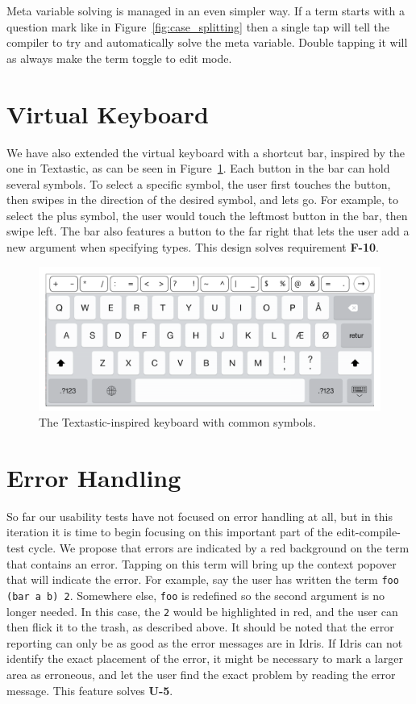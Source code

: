 Meta variable solving is managed in an even simpler way. If a term starts with
a question mark like in Figure~\ref{fig:case_splitting} then a single tap will
tell the compiler to try and automatically solve the meta variable. Double
tapping it will as always make the term toggle to edit mode.

\section{Virtual Keyboard}
\label{subsec:virtual_keyboard}
We have also extended the virtual keyboard with a shortcut bar, inspired by the one in Textastic, as can be seen in Figure~\ref{fig:design_keyboard}.
Each button in the bar can hold several symbols.
To select a specific symbol, the user first touches the button, then swipes in the direction of the desired symbol, and lets go.
For example, to select the plus symbol, the user would touch the leftmost button in the bar, then swipe left.
The bar also features a button to the far right that lets the user add a new argument when specifying types. 
This design solves requirement \textbf{F-10}. 

\begin{figure}
	\centering
		\includegraphics[width=115mm]{diagrams/design_keyboard.pdf}
	\caption{The Textastic-inspired keyboard with common symbols.}
\label{fig:design_keyboard}
\end{figure}

\section{Error Handling}
\label{subsec:error_handling}
So far our usability tests have not focused on error handling at all, but in this iteration it is time to begin focusing on this important part of the edit-compile-test cycle.
We propose that errors are indicated by a red background on the term that contains an error. 
Tapping on this term will bring up the context popover that will indicate the error.
For example, say the user has written the term \texttt{foo (bar a b) 2}.
Somewhere else, \texttt{foo} is redefined so the second argument is no longer needed.
In this case, the \texttt{2} would be highlighted in red, and the user can then flick it to the trash, as described above.
It should be noted that the error reporting can only be as good as the error messages are in Idris.
If Idris can not identify the exact placement of the error, it might be necessary to mark a larger area as erroneous, and let the user find the exact problem by reading the error message.
This feature solves \textbf{U-5}.


